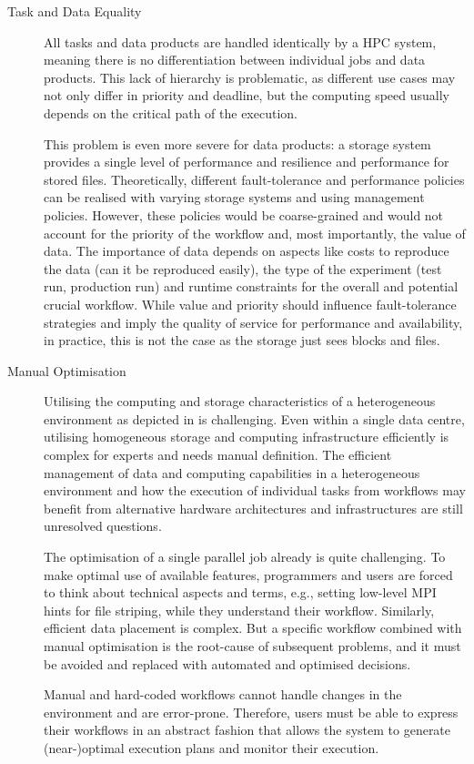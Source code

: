 \documentclass[a4paper]{article}
\begin{document}
\begin{description}
\item[Task and Data Equality]

All tasks and data products are handled identically by a HPC system, meaning there is no differentiation between individual jobs and data products.
This lack of hierarchy is problematic, as different use cases may not only differ in priority and deadline, but the computing speed usually depends on the critical path of the execution.

This problem is even more severe for data products: a storage system provides a single level of performance and resilience and performance for stored files.
Theoretically, different fault-tolerance and performance policies can be realised with varying storage systems and using management policies.
However, these policies would be coarse-grained and would not account for the priority of the workflow and, most importantly, the value of data.
The importance of data depends on aspects like costs to reproduce the data (can it be reproduced easily), the type of the experiment (test run, production run) and runtime constraints for the overall and potential crucial workflow.
While value and priority should influence fault-tolerance strategies and imply the quality of service for performance and availability, in practice, this is not the case as the storage just sees blocks and files.

\item[Manual Optimisation]

Utilising the computing and storage characteristics of a heterogeneous environment as depicted in  is challenging.
Even within a single data centre, utilising homogeneous storage and computing infrastructure efficiently is complex for experts and needs manual definition.
The efficient management of data and computing capabilities in a heterogeneous environment and
how the execution of individual tasks from workflows may benefit from alternative hardware architectures and infrastructures
are still unresolved questions.

The optimisation of a single parallel job already is quite challenging.
To make optimal use of available features, programmers and users are forced to think about technical aspects and terms, e.g., setting low-level MPI hints for file striping, while they understand their workflow.
Similarly, efficient data placement is complex. But a specific workflow combined with manual optimisation is the root-cause of subsequent problems, and it must be avoided and replaced with automated and optimised decisions.

Manual and hard-coded workflows cannot handle changes in the environment and are error-prone.
Therefore, users must be able to express their workflows in an abstract fashion that allows the system to generate (near-)optimal execution plans and monitor their execution.

\end{description}
\end{document}
